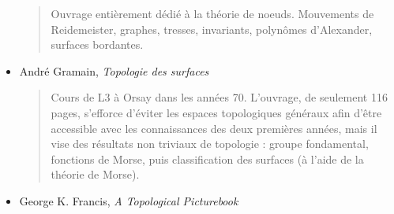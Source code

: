 \documentclass{article}
\begin{document}
\begin{itemize}
\begin{quote}
Ouvrage entièrement dédié à la théorie de noeuds. Mouvements de Reidemeister, graphes, tresses, invariants, polynômes d'Alexander, surfaces bordantes.
\end{quote}
\item André Gramain, \emph{Topologie des surfaces}
\begin{quote}
Cours de L3 à Orsay dans les années 70. L'ouvrage, de seulement 116 pages, s'efforce d'éviter les espaces topologiques généraux afin d'être accessible avec les connaissances des deux premières années, mais il vise des résultats non triviaux de topologie : groupe fondamental, fonctions de Morse, puis classification des surfaces (à l'aide de la théorie de Morse). 
\end{quote}
\item George K. Francis, \emph{A Topological Picturebook}
\end{itemize}
\end{document}
